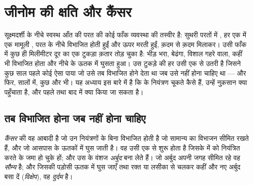 \chapter{जीनोम की क्षति और कैंसर}\label{ch:g11:cancer}

सूक्ष्मदर्शी के नीचे स्वस्थ आँत की परत की कोई फाँक व्यवस्था की तस्वीर है:
सुथरी परतों में , हर एक में एक मामूली , परत के नीचे विभाजित
होती हुईं और ऊपर मरती हुईं, क़दम से क़दम मिलाकर। उसी फाँक में कुछ ही
मिलीमीटर दूर  का एक टुकड़ा क़तार तोड़ चुका है: भीड़ भरा, बेढंगा,
विशाल गहरे  वाला, कहीं भी विभाजित होता और नीचे के ऊतक में घुसता
हुआ। उस टुकड़े की हर  उसी एक  से उतरी है जिसने कुछ साल पहले
कोई ऐसा  पाया जो उसे तब विभाजित होने देता था जब उसे नहीं होना
चाहिए था --- और फिर, सालों में, कुछ और भी। यह अध्याय इस बारे में है कि
 के नियंत्रण चूकते कैसे हैं, उन्हें नुक़सान क्या पहुँचाता है,
और पहले तथा बाद में क्या किया जा सकता है।

\section{तब विभाजित होना जब नहीं होना चाहिए}

\begin{definition}[कैंसर]\label{def:g11:cancer:cancer}
\emph{कैंसर}  की वह आबादी है जो उन नियंत्रणों के बिना
विभाजित होती है जो सामान्य  का विभाजन सीमित रखते हैं, और जो
आसपास के ऊतकों में घुस जाती है। वह उसी एक  से शुरू होता है जिसके
 में  को नियंत्रित करते  के  जमा हो चुके
हों; और उस  के वंशज \emph{अर्बुद} बना लेते हैं। जो
अर्बुद अपनी जगह सीमित रहे वह \emph{सौम्य} है; और जिसकी  पड़ोसी
ऊतक में घुस जाएँ तथा रक्त या लसीका से चलकर कहीं और नए अर्बुद बसा दें
(\emph{विक्षेप}), वह \emph{दुर्दम} है।
\end{definition}

